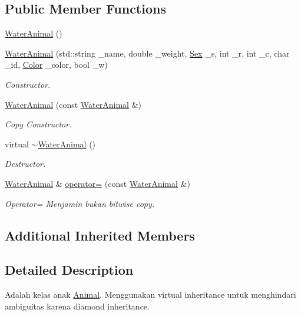 \subsection*{Public Member Functions}
\begin{DoxyCompactItemize}
\item 
\hyperlink{classWaterAnimal_a1fc491e4b3c3eefa7c24ef56750c0c3d}{Water\+Animal} ()
\item 
\hyperlink{classWaterAnimal_a77010ba2fe67207ea2869126e0d54de1}{Water\+Animal} (std\+::string \+\_\+name, double \+\_\+weight, \hyperlink{sex_8h_a2633cb393c68bb2ee8080db58fb7ba93}{Sex} \+\_\+s, int \+\_\+r, int \+\_\+c, char \+\_\+id, \hyperlink{color_8h_ab87bacfdad76e61b9412d7124be44c1c}{Color} \+\_\+color, bool \+\_\+w)
\begin{DoxyCompactList}\small\item\em Constructor. \end{DoxyCompactList}\item 
\hyperlink{classWaterAnimal_a6b05aefda40def7833a1e8556faefbe2}{Water\+Animal} (const \hyperlink{classWaterAnimal}{Water\+Animal} \&)
\begin{DoxyCompactList}\small\item\em Copy Constructor. \end{DoxyCompactList}\item 
virtual \hyperlink{classWaterAnimal_a0afd9a4c91eef1c50b882efc9a5f2066}{$\sim$\+Water\+Animal} ()
\begin{DoxyCompactList}\small\item\em Destructor. \end{DoxyCompactList}\item 
\hyperlink{classWaterAnimal}{Water\+Animal} \& \hyperlink{classWaterAnimal_aa47c6f916c416fad25443f2e212a0387}{operator=} (const \hyperlink{classWaterAnimal}{Water\+Animal} \&)
\begin{DoxyCompactList}\small\item\em Operator= Menjamin bukan bitwise copy. \end{DoxyCompactList}\end{DoxyCompactItemize}
\subsection*{Additional Inherited Members}


\subsection{Detailed Description}
Adalah kelas anak \hyperlink{classAnimal}{Animal}. Menggunakan virtual inheritance untuk menghindari ambiguitas karena diamond inheritance. 

